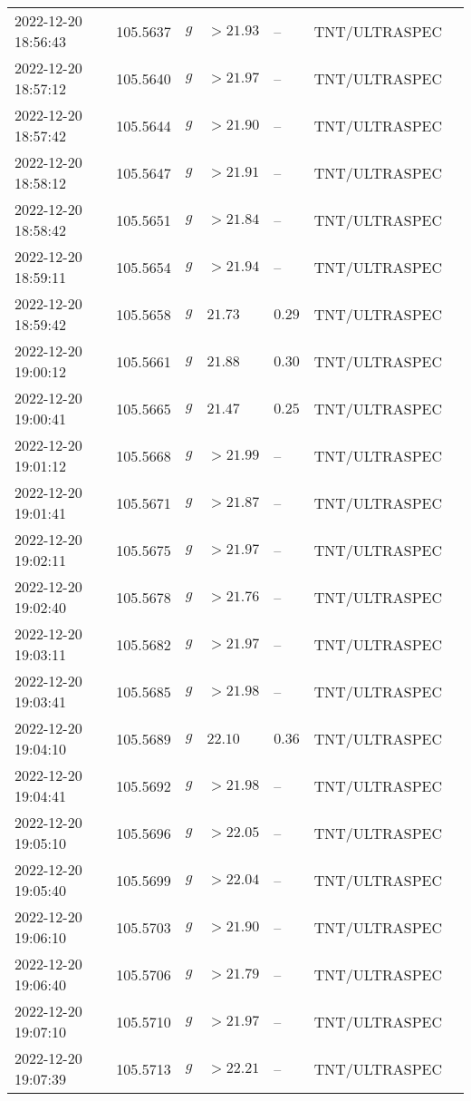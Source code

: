 \documentclass{nature_plusfigure}
\begin{document}
\begin{supplement}
\begin{center}
\begin{longtable}{lllllll}
2022-12-20 18:56:43 & 105.5637 & $g$ & $>21.93$ & -- & TNT/ULTRASPEC &  \\ 
2022-12-20 18:57:12 & 105.5640 & $g$ & $>21.97$ & -- & TNT/ULTRASPEC &  \\ 
2022-12-20 18:57:42 & 105.5644 & $g$ & $>21.90$ & -- & TNT/ULTRASPEC &  \\ 
2022-12-20 18:58:12 & 105.5647 & $g$ & $>21.91$ & -- & TNT/ULTRASPEC &  \\ 
2022-12-20 18:58:42 & 105.5651 & $g$ & $>21.84$ & -- & TNT/ULTRASPEC &  \\ 
2022-12-20 18:59:11 & 105.5654 & $g$ & $>21.94$ & -- & TNT/ULTRASPEC &  \\ 
2022-12-20 18:59:42 & 105.5658 & $g$ & $21.73$ & $0.29$ & TNT/ULTRASPEC &  \\ 
2022-12-20 19:00:12 & 105.5661 & $g$ & $21.88$ & $0.30$ & TNT/ULTRASPEC &  \\ 
2022-12-20 19:00:41 & 105.5665 & $g$ & $21.47$ & $0.25$ & TNT/ULTRASPEC &  \\ 
2022-12-20 19:01:12 & 105.5668 & $g$ & $>21.99$ & -- & TNT/ULTRASPEC &  \\ 
2022-12-20 19:01:41 & 105.5671 & $g$ & $>21.87$ & -- & TNT/ULTRASPEC &  \\ 
2022-12-20 19:02:11 & 105.5675 & $g$ & $>21.97$ & -- & TNT/ULTRASPEC &  \\ 
2022-12-20 19:02:40 & 105.5678 & $g$ & $>21.76$ & -- & TNT/ULTRASPEC &  \\ 
2022-12-20 19:03:11 & 105.5682 & $g$ & $>21.97$ & -- & TNT/ULTRASPEC &  \\ 
2022-12-20 19:03:41 & 105.5685 & $g$ & $>21.98$ & -- & TNT/ULTRASPEC &  \\ 
2022-12-20 19:04:10 & 105.5689 & $g$ & $22.10$ & $0.36$ & TNT/ULTRASPEC &  \\ 
2022-12-20 19:04:41 & 105.5692 & $g$ & $>21.98$ & -- & TNT/ULTRASPEC &  \\ 
2022-12-20 19:05:10 & 105.5696 & $g$ & $>22.05$ & -- & TNT/ULTRASPEC &  \\ 
2022-12-20 19:05:40 & 105.5699 & $g$ & $>22.04$ & -- & TNT/ULTRASPEC &  \\ 
2022-12-20 19:06:10 & 105.5703 & $g$ & $>21.90$ & -- & TNT/ULTRASPEC &  \\ 
2022-12-20 19:06:40 & 105.5706 & $g$ & $>21.79$ & -- & TNT/ULTRASPEC &  \\ 
2022-12-20 19:07:10 & 105.5710 & $g$ & $>21.97$ & -- & TNT/ULTRASPEC &  \\ 
2022-12-20 19:07:39 & 105.5713 & $g$ & $>22.21$ & -- & TNT/ULTRASPEC &  \\ 

\end{longtable}
\end{center}
\end{supplement}
\end{document}
